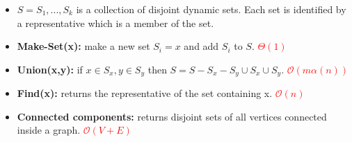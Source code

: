 \documentclass[a4paper,landscape]{article}
\newcommand{\timecomplexity}[1]{\textcolor{red}{#1}}
\newcommand{\bigo}{\mathcal{O}}
\begin{document}
\begin{multicols}{7}
\tcolorbox[mybox={Disjoint sets}]
\begin{itemize}[noitemsep,itemsep=0pt]
    \item \(S = {S_1, ..., S_k}\) is a collection of disjoint dynamic sets. Each set is identified by a representative which is a member of the set.
    \item \textbf{Make-Set(x):} make a new set \(S_i = {x}\) and add $S_i$ to $S$. \timecomplexity{\(\Theta(1)\)}
    \item \textbf{Union(x,y):} if \(x \in S_x, y \in S_y\) then \(S = S - S_x - S_y \cup {S_x \cup S_y}\). \timecomplexity{\(\bigo(m \alpha(n))\)}
    \item \textbf{Find(x):} returns the representative of the set containing x. \timecomplexity{\(\bigo(n)\)}
    \item \textbf{Connected components:} returns disjoint sets of all vertices connected inside a graph. \timecomplexity{\(\bigo(V+E)\)}
\end{itemize}
\endtcolorbox


\end{multicols}
\end{document}
